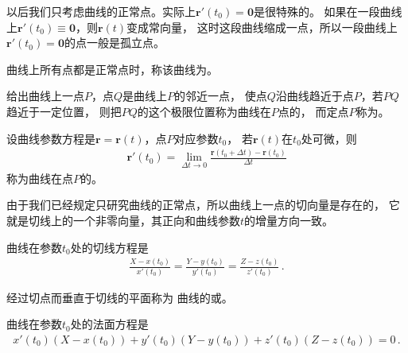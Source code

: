 以后我们只考虑曲线的正常点。实际上$\bm r'(t_0)=\bm 0$是很特殊的。
如果在一段曲线上$\bm r'(t_0)\equiv\bm 0$，则$\bm r(t)$变成常向量，
这时这段曲线缩成一点，所以一段曲线上$\bm r'(t_0)=\bm 0$的点一般是孤立点。
\begin{definition}
    曲线上所有点都是正常点时，称该曲线为。
\end{definition}

\begin{definition}
    给出曲线上一点$P$，点$Q$是曲线上$P$的邻近一点，
    使点$Q$沿曲线趋近于点$P$，若$PQ$趋近于一定位置，
    则把$PQ$的这个极限位置称为曲线在$P$点的，
    而定点$P$称为。
\end{definition}

\begin{definition}
    设曲线参数方程是$\bm r=\bm r(t)$，点$P$对应参数$t_0$，
    若$\bm r(t)$在$t_0$处可微，则
    \begin{align}\label{eq:03ex01.5}
        \bm r'(t_0)=\lim\limits_{\Delta t\rightarrow0}{\frac{\bm r(t_0+\Delta t)-\bm r(t_0)}{\Delta t}}
    \end{align}
    称为曲线在点$P$的。
\end{definition}

由于我们已经规定只研究曲线的正常点，所以曲线上一点的切向量是存在的，
它就是切线上的一个非零向量，其正向和曲线参数$t$的增量方向一致。

\begin{corollary}
    曲线在参数$t_0$处的切线方程是
    \begin{align}\label{eq:03ex01.6}
        \frac{X-x(t_0)}{x'(t_0)}=\frac{Y-y(t_0)}{y'(t_0)}=\frac{Z-z(t_0)}{z'(t_0)}\, .
    \end{align}
\end{corollary}

\begin{definition}
    经过切点而垂直于切线的平面称为
    曲线的或。
\end{definition}

\begin{corollary}
    曲线在参数$t_0$处的法面方程是
    \begin{align}\label{eq:03ex01.7}
        x'(t_0)(X-x(t_0))+y'(t_0)(Y-y(t_0))+z'(t_0)(Z-z(t_0))=0\, .
    \end{align}
\end{corollary}

